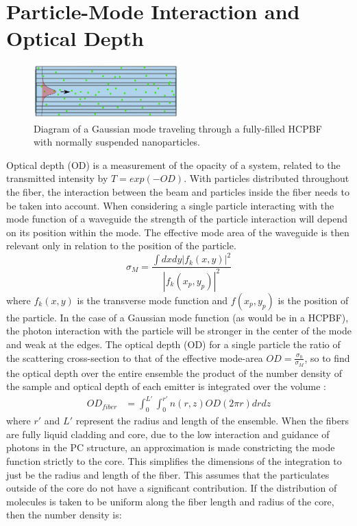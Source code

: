 \section{Particle-Mode Interaction and Optical Depth}
\begin{figure}[!htb]
	\centering
	\includegraphics[width=0.5\textwidth]{./Figures/ICG/icgfibermode.png}
	\caption{Diagram of a Gaussian mode traveling through a fully-filled HCPBF with normally suspended nanoparticles.}
	\label{fig:icg_mode}
\end{figure}
Optical depth (OD) is a measurement of the opacity of a system, related to the transmitted intensity by $T = exp(-OD)$. With particles distributed throughout the fiber, the interaction between the beam and particles inside the fiber needs to be taken into account. When considering a single particle interacting with the mode function of a waveguide the strength of the particle interaction will depend on its position within the mode\cite{domokos, mazoni}. The effective mode area of the waveguide is then relevant only in relation to the position of the particle. 
\begin{equation}
	\sigma_M = \frac{\int dxdy|f_k(x, y)|^2}{|f_k(x_p, y_p)|^2}
\end{equation}
where $f_k(x,y)$ is the transverse mode function and $f(x_p,y_p )$ is the position of the particle. In the case of a Gaussian mode function (as would be in a HCPBF), the photon interaction with the particle will be stronger in the center of the mode and weak at the edges. The optical depth (OD) for a single particle the ratio of the scattering cross-section to that of the effective mode-area $OD =\frac{\sigma_0}{\sigma_M}$, so to find the optical depth over the entire ensemble the product of the number density of the sample and optical depth of each emitter is integrated over the volume :
\begin{equation}
	\begin{aligned}
		OD_{fiber} &= \int^{L'}_0 \int^{r'}_0 n(r, z)OD(2\pi r) dr dz 
	\end{aligned}
\end{equation}
where $r'$ and $L'$ represent the radius and length of the ensemble.  When the fibers are fully liquid cladding and core, due to the low interaction and guidance of photons in the PC structure, an approximation is made constricting the mode function strictly to the core. This simplifies the dimensions of the integration to just be the radius and length of the fiber. This assumes that the particulates outside of the core do not have a significant contribution.  If the distribution of molecules is taken to be uniform along the fiber length and radius of the core, then the number density is: 
